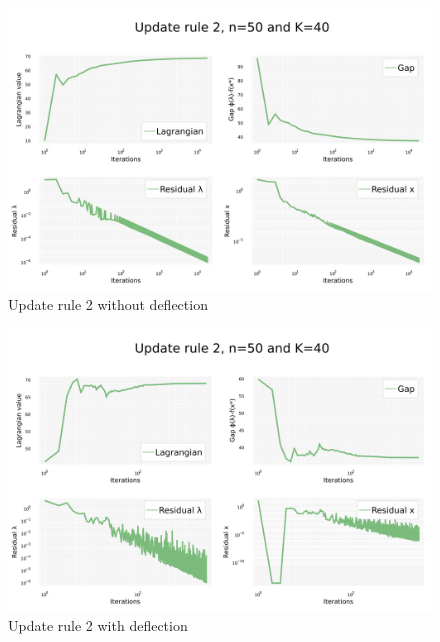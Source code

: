 \documentclass[notitlepage]{article}
\begin{document}
\newpage

\begin{figure}[H]
  \centering
  \includegraphics[scale=0.25]{pics/pd_q/Rule=2_n=50_K=40_defl=false.png}
  \caption{Update rule 2 without deflection}
  \label{fig:rule-2-n-50-k-40}
\end{figure}

\begin{figure}[H]
  \centering
  \includegraphics[scale=0.25]{pics/pd_q/Rule=2_n=50_K=40_defl=true.png}
  \caption{Update rule 2 with deflection}
  \label{fig:rule-2-n-50-k-40-defl}
\end{figure}

\newpage
\end{document}
